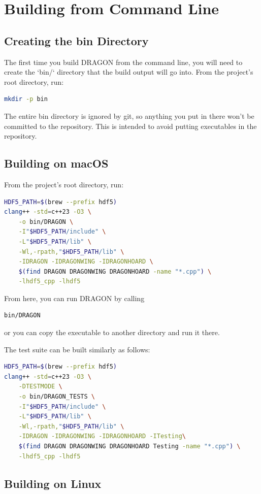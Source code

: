 \documentclass[11pt]{report}
\begin{document}
\section{Building from Command Line}

\subsection{Creating the bin Directory}

The first time you build DRAGON from the command line, you will need to create the `bin/` directory that the build output will go into.
 From the project's root directory, run:
\begin{lstlisting}[language=bash]
mkdir -p bin
\end{lstlisting}
The entire bin directory is ignored by git, so anything you put in there won't be committed to the repository. This is intended to avoid putting executables in the repository.


\subsection{Building on macOS}
\label{sec:usage-macos-cli}

From the project's root directory, run:
\begin{lstlisting}[language=bash]
HDF5_PATH=$(brew --prefix hdf5)
clang++ -std=c++23 -O3 \
    -o bin/DRAGON \
    -I"$HDF5_PATH/include" \
    -L"$HDF5_PATH/lib" \
    -Wl,-rpath,"$HDF5_PATH/lib" \
    -IDRAGON -IDRAGONWING -IDRAGONHOARD \
    $(find DRAGON DRAGONWING DRAGONHOARD -name "*.cpp") \
    -lhdf5_cpp -lhdf5
\end{lstlisting}
From here, you can run DRAGON by calling
\begin{lstlisting}[language=bash]
bin/DRAGON
\end{lstlisting}
or you can copy the executable to another directory and run it there.

The test suite can be built similarly as follows:
\begin{lstlisting}[language=bash]
HDF5_PATH=$(brew --prefix hdf5)
clang++ -std=c++23 -O3 \
    -DTESTMODE \
    -o bin/DRAGON_TESTS \
    -I"$HDF5_PATH/include" \
    -L"$HDF5_PATH/lib" \
    -Wl,-rpath,"$HDF5_PATH/lib" \
    -IDRAGON -IDRAGONWING -IDRAGONHOARD -ITesting\
    $(find DRAGON DRAGONWING DRAGONHOARD Testing -name "*.cpp") \
    -lhdf5_cpp -lhdf5
\end{lstlisting}

\subsection{Building on Linux}
\label{sec:usage-linux}
\end{document}
